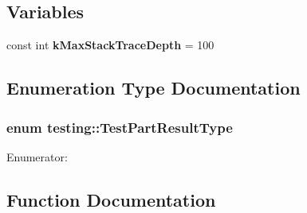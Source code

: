 \subsection*{Variables}
\begin{CompactItemize}
\item 
const int {\bf kMaxStackTraceDepth} = 100
\end{CompactItemize}


\subsection{Enumeration Type Documentation}
\subsubsection{\setlength{\rightskip}{0pt plus 5cm}enum {\bf testing::TestPartResultType}}\label{namespacetesting_e87109d90628580ab2d751fcb36fc975}


\begin{Desc}
\item[Enumerator: ]\par
\begin{description}
\item[{\em 
TPRT\_\-SUCCESS\label{namespacetesting_e87109d90628580ab2d751fcb36fc975e815b64e766eaff67a27e79f4346a037}
}]\item[{\em 
TPRT\_\-NONFATAL\_\-FAILURE\label{namespacetesting_e87109d90628580ab2d751fcb36fc97512d14e9cb7a971c442a978b125fef228}
}]\item[{\em 
TPRT\_\-FATAL\_\-FAILURE\label{namespacetesting_e87109d90628580ab2d751fcb36fc975be071bd93da3babe196a6e02914ee679}
}]\end{description}
\end{Desc}



\subsection{Function Documentation}
